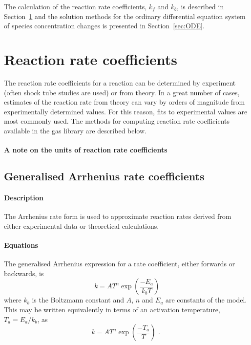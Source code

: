 The calculation of the reaction rate coefficients, $k_f$ and $k_b$, is described in
Section~\ref{sec:reac_coeffs} and the solution methods for the ordinary differential
equation system of species concentration changes is presented in Section~\ref{sec:ODE}.

\section{Reaction rate coefficients}
\label{sec:reac_coeffs}

The reaction rate coefficients for a reaction can be determined by experiment (often
shock tube studies are used) or from theory.
In a great number of cases, estimates of the reaction rate from theory can vary by
orders of magnitude from experimentally determined values.
For this reason, fits to experimental values are most commonly used.
The methods for computing reaction rate coefficients available in the
gas library are described below.

\paragraph{A note on the units of reaction rate coefficients}



\subsection{Generalised Arrhenius rate coefficients}
\paragraph{Description}
The Arrhenius rate form is used to approximate reaction
rates derived from either experimental data
or theoretical calculations.

\paragraph{Equations}

The generalised Arrhenius expression for a rate coefficient, either forwards or backwards, is
\begin{equation}
\label{eqn:ga}
k = A T^{n} \exp{\left( \frac{-E_a}{k_bT}\right)}
\end{equation}
where $k_b$ is the Boltzmann constant and $A$, $n$ and $E_a$ are constants
of the model.
This may be written equivalently in terms of an activation
temperature, $T_a = E_a/k_b$, as
\begin{equation}
k = A T^{n} \exp{\left( \frac{-T_a}{T}\right)} \text{ . }
\end{equation}


